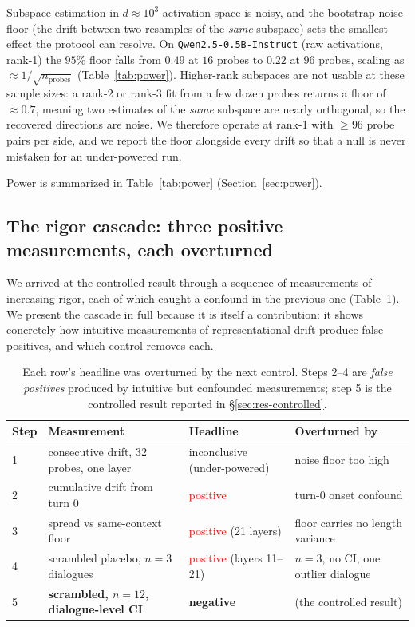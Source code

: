 Subspace estimation in $d\!\approx\!10^3$ activation space is noisy, and the bootstrap noise
floor (the drift between two resamples of the \emph{same} subspace) sets the smallest effect
the protocol can resolve. On \texttt{Qwen2.5-0.5B-Instruct} (raw activations, rank-1) the
$95\%$ floor falls from $0.49$ at $16$ probes to $0.22$ at $96$ probes, scaling as
$\approx 1/\sqrt{n_{\text{probes}}}$ (Table~\ref{tab:power}). Higher-rank subspaces are not
usable at these sample sizes: a rank-2 or rank-3 fit from a few dozen probes returns a floor
of $\approx 0.7$, meaning two estimates of the \emph{same} subspace are nearly orthogonal, so
the recovered directions are noise. We therefore operate at rank-1 with $\geq 96$ probe pairs
per side, and we report the floor alongside every drift so that a null is never mistaken for
an under-powered run.

Power is summarized in Table~\ref{tab:power} (Section~\ref{sec:power}).

\subsection{The rigor cascade: three positive measurements, each overturned}
\label{sec:res-cascade}\label{sec:cascade}

We arrived at the controlled result through a sequence of measurements of increasing rigor,
each of which caught a confound in the previous one (Table~\ref{tab:cascade}). We present the
cascade in full because it is itself a contribution: it shows concretely how intuitive
measurements of representational drift produce false positives, and which control removes each.

\begin{table}[t]
\centering
\small
\begin{tabular}{@{}llll@{}}
\toprule
Step & Measurement & Headline & Overturned by \\
\midrule
1 & consecutive drift, 32 probes, one layer & inconclusive (under-powered) & noise floor too high \\
2 & cumulative drift from turn 0 & \textcolor{red}{positive} & turn-0 onset confound \\
3 & spread vs same-context floor & \textcolor{red}{positive} (21 layers) & floor carries no length variance \\
4 & scrambled placebo, $n{=}3$ dialogues & \textcolor{red}{positive} (layers 11--21) & $n{=}3$, no CI; one outlier dialogue \\
5 & \textbf{scrambled, $n{=}12$, dialogue-level CI} & \textbf{negative} & (the controlled result) \\
\bottomrule
\end{tabular}
\caption{Each row's headline was overturned by the next control. Steps 2--4 are \emph{false
positives} produced by intuitive but confounded measurements; step 5 is the controlled result
reported in \S\ref{sec:res-controlled}.}
\label{tab:cascade}
\end{table}

